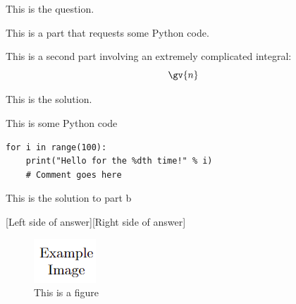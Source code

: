 
This is the question.
\begin{alpQ}
	\item This is a part that requests some Python code.
	\item This is a second part involving an extremely complicated integral: \[\gv{n}\]
\end{alpQ}

\midsep

\begin{solution}

	This is the solution.
	\begin{alpQ}
		\item This is some Python code
		\begin{verbatim}
for i in range(100):
	print("Hello for the %dth time!" % i)
	# Comment goes here
		\end{verbatim}
		\item This is the solution to part b

		\lsplit{
			\[\gv{n} = 1 \]
		}
		{
		}
		[Left side of answer][Right side of answer]

	\end{alpQ}

	\begin{figure}[h]
		\centering
		\includegraphics{example image.png}
		\caption{This is a figure}
		\label{fig:example figure}
	\end{figure}

\end{solution}